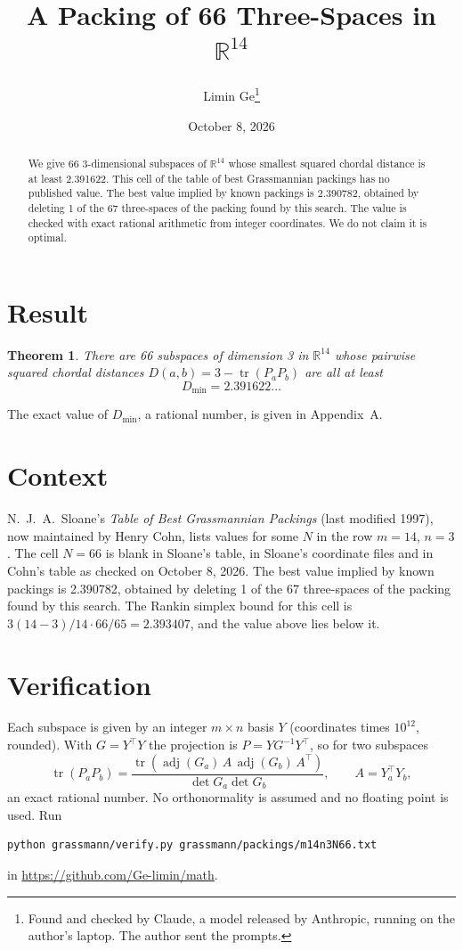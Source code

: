 \documentclass[11pt,a4paper]{article}
\title{A Packing of 66 Three-Spaces in $\mathbb{R}^{14}$}
\author{Limin Ge\thanks{Found and checked by Claude, a model released by Anthropic, running on the author's laptop. The author sent the prompts.}}
\date{October 8, 2026}
\newtheorem*{theorem}{Theorem}
\begin{document}
\maketitle
\begin{abstract}
We give 66 3-dimensional subspaces of $\mathbb{R}^{14}$ whose smallest squared chordal distance is at least 2.391622. This cell of the table of best Grassmannian packings has no published value. The best value implied by known packings is 2.390782, obtained by deleting 1 of the 67 three-spaces of the packing found by this search. The value is checked with exact rational arithmetic from integer coordinates. We do not claim it is optimal.
\end{abstract}

\section{Result}
\begin{theorem}
There are 66 subspaces of dimension 3 in $\mathbb{R}^{14}$ whose pairwise squared chordal distances $D(a,b) = 3 - \operatorname{tr}(P_aP_b)$ are all at least
\[ D_{\min} = 2.391622\ldots \]
\end{theorem}
The exact value of $D_{\min}$, a rational number, is given in Appendix~A.


\section{Context}
N.~J.~A.~Sloane's \emph{Table of Best Grassmannian Packings} (last modified 1997), now maintained by Henry Cohn, lists values for some $N$ in the row $m=14$, $n=3$. The cell $N=66$ is blank in Sloane's table, in Sloane's coordinate files and in Cohn's table as checked on October 8, 2026. The best value implied by known packings is 2.390782, obtained by deleting 1 of the 67 three-spaces of the packing found by this search. The Rankin simplex bound for this cell is $3(14-3)/14\cdot 66/65 = 2.393407$, and the value above lies below it.


\section{Verification}
Each subspace is given by an integer $m\times n$ basis $Y$ (coordinates times $10^{12}$, rounded). With $G=Y^\top Y$ the projection is $P=YG^{-1}Y^\top$, so for two subspaces
\[ \operatorname{tr}(P_aP_b)=\frac{\operatorname{tr}(\operatorname{adj}(G_a)\,A\,\operatorname{adj}(G_b)\,A^\top)}{\det G_a\det G_b},\qquad A=Y_a^\top Y_b, \]
an exact rational number. No orthonormality is assumed and no floating point is used. Run
\begin{verbatim}
python grassmann/verify.py grassmann/packings/m14n3N66.txt
\end{verbatim}
in \url{https://github.com/Ge-limin/math}.
\end{document}
